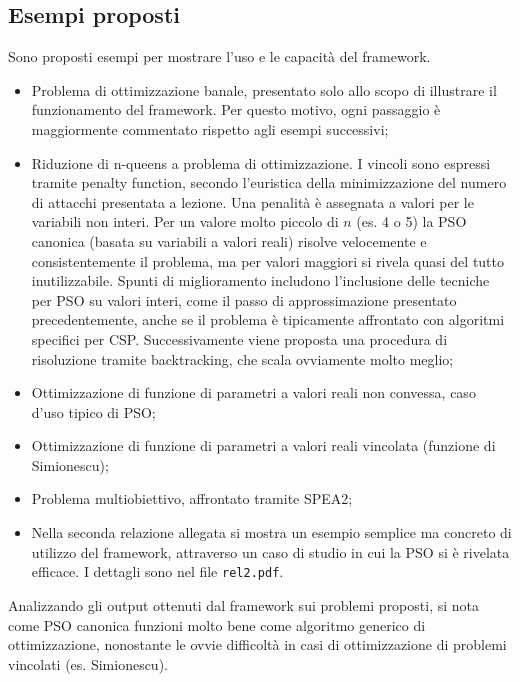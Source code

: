 \documentclass[12pt]{article}
\begin{document}
\subsection*{Esempi proposti}

Sono proposti esempi per mostrare l'uso e le capacità del framework.
\begin{itemize}
\item Problema di ottimizzazione banale, presentato solo allo scopo di illustrare il funzionamento del framework. Per questo motivo, ogni passaggio è maggiormente commentato rispetto agli esempi successivi;
\item Riduzione di n-queens a problema di ottimizzazione. I vincoli sono espressi tramite penalty function, secondo l'euristica della minimizzazione del numero di attacchi presentata a lezione. Una penalità è assegnata a valori per le variabili non interi. Per un valore molto piccolo di $n$ (es. 4 o 5) la PSO canonica (basata su variabili a valori reali) risolve velocemente e consistentemente il problema, ma per valori maggiori si rivela quasi del tutto inutilizzabile. Spunti di miglioramento includono l'inclusione delle tecniche per PSO su valori interi, come il passo di approssimazione presentato precedentemente, anche se il problema è tipicamente affrontato con algoritmi specifici per CSP. Successivamente viene proposta una procedura di risoluzione tramite backtracking, che scala ovviamente molto meglio;
\item Ottimizzazione di funzione di parametri a valori reali non convessa, caso d'uso tipico di PSO;
\item Ottimizzazione di funzione di parametri a valori reali vincolata (funzione di Simionescu);
\item Problema multiobiettivo, affrontato tramite SPEA2;
\item Nella seconda relazione allegata si mostra un esempio semplice ma concreto di utilizzo del framework, attraverso un caso di studio in cui la PSO si è rivelata efficace. I dettagli sono nel file \texttt{rel2.pdf}.
\end{itemize}
Analizzando gli output ottenuti dal framework sui problemi proposti, si nota come PSO canonica funzioni molto bene come algoritmo generico di ottimizzazione, nonostante le ovvie difficoltà in casi di ottimizzazione di problemi vincolati (es. Simionescu). 
\end{document}
